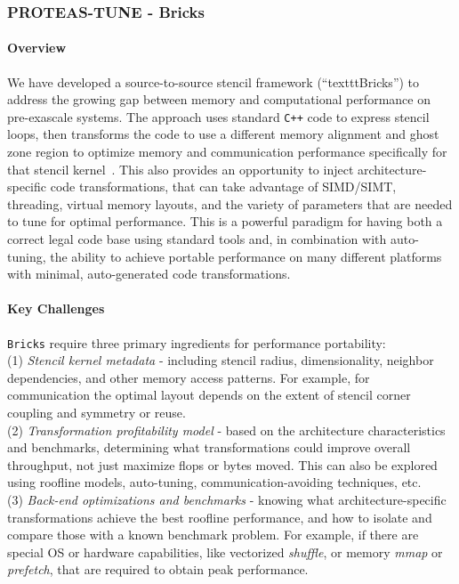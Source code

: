 \subsubsection{ PROTEAS-TUNE - Bricks} 

\paragraph{Overview}
We have developed a source-to-source stencil framework (``texttt{Bricks}'')
  to address the growing gap between memory and computational performance 
  on pre-exascale systems.
The approach uses standard \texttt{C++} code to express stencil loops, 
  then transforms the code to use a different memory alignment and ghost
  zone region to optimize memory and communication performance specifically
  for that stencil kernel~\cite{P3HPC_Bricks,zhao2019,zhaoMPI2019}.
This also provides an opportunity to inject architecture-specific code
  transformations, that can take advantage of SIMD/SIMT, threading,
  virtual memory layouts, and the variety of parameters that are needed to 
  tune for optimal performance.
This is a powerful paradigm for having both a correct legal code base 
  using standard tools and, in combination with auto-tuning, 
  the ability to achieve portable performance on many different 
  platforms with minimal, auto-generated code transformations.

\paragraph{Key Challenges}
\texttt{Bricks} require three primary ingredients for performance portability:
\\
(1) \textit{Stencil kernel metadata} - including stencil radius,
  dimensionality, neighbor dependencies, and other memory access patterns.
  For example, for communication the optimal layout depends on the
  extent of stencil corner coupling and symmetry or reuse.
\\
(2) \textit{Transformation profitability model} - based on the architecture
  characteristics and benchmarks, determining what transformations could
  improve overall throughput, not just maximize flops or bytes moved. 
  This can also be explored using roofline models, auto-tuning, 
  communication-avoiding techniques, etc.
\\
(3) \textit{Back-end optimizations and benchmarks} - knowing what 
  architecture-specific transformations achieve the best roofline performance, 
  and how to isolate and compare those with a known benchmark problem. 
For example, if there
  are special OS or hardware capabilities, like vectorized \textit{shuffle}, 
  or memory \textit{mmap} or \textit{prefetch}, that are required to obtain
  peak performance.

